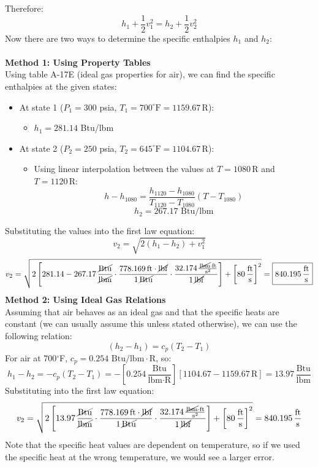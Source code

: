 \documentclass[12pt]{article}
\begin{document}
Therefore:
\[h_1 +\frac{1}{2}v_1^2 = h_2 +\frac{1}{2}v_2^2\]
Now there are two ways to determine the specific enthalpies $h_1$ and $h_2$:\\\\
\textbf{Method 1: Using Property Tables}\\
Using table A-17E (ideal gas properties for air), we can find the specific enthalpies at the given states:
\begin{itemize}
    \item At state 1 ($P_1=300$ psia, $T_1=700^\circ\text{F} = 1159.67\,\text{R}$):
    \begin{itemize}
        \item $h_1 = 281.14$ Btu/lbm
    \end{itemize}
    \item At state 2 ($P_2=250$ psia, $T_2=645^\circ\text{F} = 1104.67\,\text{R}$):
    \begin{itemize}
        \item Using linear interpolation between the values at $T=1080\,\text{R}$ and $T=1120\,\text{R}$:
        \[h-h_{1080} = \frac{h_{1120}-h_{1080}}{T_{1120}-T_{1080}}(T-T_{1080})\]
        \[h_2 = 267.17 \text{ Btu/lbm}\]
    \end{itemize}
\end{itemize}
Substituting the values into the first law equation:
\[v_2 = \sqrt{2(h_1 - h_2) + v_1^2}\]
\[v_2 = \sqrt{2\left[281.14-267.17\,\frac{\cancel{\text{Btu}}}{\cancel{\text{lbm}}}\cdot\frac{778.169\,\text{ft}\cdot\cancel{\text{lbf}}}{1\,\cancel{\text{Btu}}}\cdot\frac{32.174\,\frac{\cancel{\text{lbm}}\cdot\text{ft}}{\text{s}^2}}{1\,\cancel{\text{lbf}}}\right]+\left[80\,\frac{\text{ft}}{\text{s}}\right]^2} = \boxed{840.195\,\frac{\text{ft}}{\text{s}}}\]
\textbf{Method 2: Using Ideal Gas Relations}\\
Assuming that air behaves as an ideal gas and that the specific heats are constant (we can usually assume this unless stated otherwise), we can use the following relation:
\[(h_2 - h_1) = c_p (T_2 - T_1)\]
For air at 700$^\circ$F, $c_p = 0.254 \text{ Btu/lbm}\cdot\text{R}$, so:
\[h_1 - h_2 = -c_p (T_2 - T_1) = -\left[0.254 \,\frac{\text{Btu}}{\text{lbm}\cdot\text{R}}\right][1104.67 - 1159.67 \,\text{R}]=13.97\,\frac{\text{Btu}}{\text{lbm}}\]
Substituting into the first law equation:
\[v_2 = \sqrt{2\left[13.97\,\frac{\cancel{\text{Btu}}}{\cancel{\text{lbm}}}\cdot\frac{778.169\,\text{ft}\cdot\cancel{\text{lbf}}}{1\,\cancel{\text{Btu}}}\cdot\frac{32.174\,\frac{\cancel{\text{lbm}}\cdot\text{ft}}{\text{s}^2}}{1\,\cancel{\text{lbf}}}\right]+\left[80\,\frac{\text{ft}}{\text{s}}\right]^2} = 840.195\,\frac{\text{ft}}{\text{s}}\]
Note that the specific heat values are dependent on temperature, so if we used the specific heat at the wrong temperature, we would see a larger error.
\end{document}
